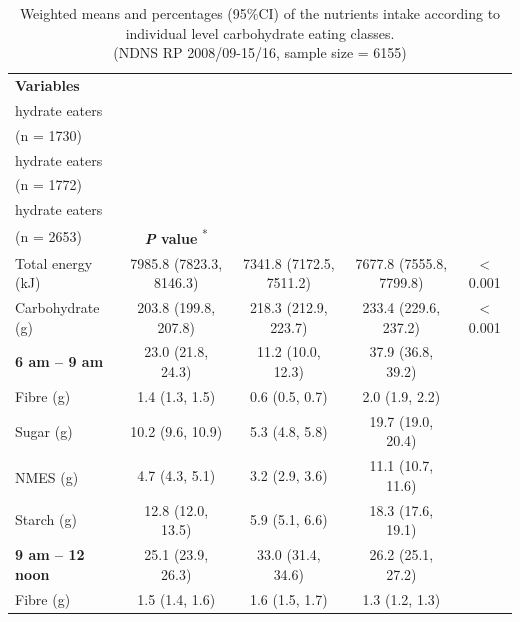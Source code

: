 \begin{table}[H]
	
	\caption{\label{tab:tab-nutri-indi}Weighted means and percentages (95\%CI) of the nutrients intake according to individual level carbohydrate eating classes.  \\ (NDNS RP 2008/09-15/16, sample size = 6155)}\vspace{-0.3cm}
	\centering
	\fontsize{9}{11}\selectfont
	\begin{tabular}[t]{lcccc}
		\hiderowcolors
		\toprule
	\textbf{Variables} & \textbf{\Centerstack{Low carbo-\\hydrate eaters\\(n = 1730)}} & \textbf{\Centerstack{Moderate carbo-\\hydrate eaters\\(n = 1772)}} & \textbf{\Centerstack{High carbo-\\hydrate eaters\\(n = 2653)}} & \textbf{\textit{P} value} \textsuperscript{*}\\
		\midrule
		\showrowcolors
		Total energy (kJ) & 7985.8 (7823.3, 8146.3) & 7341.8 (7172.5, 7511.2) & 7677.8 (7555.8, 7799.8) & < 0.001\\
		Carbohydrate (g) & 203.8 (199.8, 207.8) & 218.3 (212.9, 223.7) & 233.4 (229.6, 237.2) & < 0.001\\
		\hspace{1em}\textbf{6 am – 9 am} & 23.0 (21.8,  24.3) & 11.2 (10.0, 12.3) & 37.9 (36.8, 39.2) & \\
		\hspace{2em}Fibre (g) & 1.4 (1.3, 1.5) & 0.6 (0.5, 0.7) & 2.0 (1.9, 2.2) & \\
		\hspace{2em}Sugar (g) & 10.2 (9.6, 10.9) & 5.3 (4.8, 5.8) & 19.7 (19.0, 20.4) & \\
		\hspace{3em}NMES (g)\textsuperscript{\dag} & 4.7 (4.3, 5.1) & 3.2 (2.9, 3.6) & 11.1 (10.7, 11.6) & \\
		\hspace{2em}Starch (g) & 12.8 (12.0, 13.5) & 5.9 (5.1, 6.6) & 18.3 (17.6, 19.1) & \\
		\hspace{1em}\textbf{9 am – 12 noon} & 25.1 (23.9, 26.3) & 33.0 (31.4, 34.6) & 26.2 (25.1, 27.2) & \\
		\hspace{2em}Fibre (g) & 1.5 (1.4, 1.6) & 1.6 (1.5, 1.7) & 1.3 (1.2, 1.3) & \\

\end{tabular}
\end{table}
